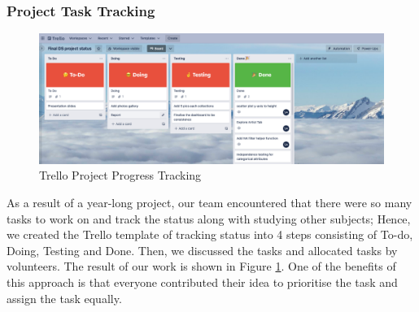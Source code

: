 \documentclass[11pt, oneside]{article}
\begin{document}
\subsubsection{Project Task Tracking}
\begin{figure}[H]
    \centering
    \includegraphics[scale=0.3]{images/Trello_tracking.png}
    \caption{Trello Project Progress Tracking}
    \label{Trello_tracking}
\end{figure}
As a result of a year-long project, our team encountered that there were so many tasks to work on and track the status along with studying other subjects; Hence, we created the Trello template of tracking status into 4 steps consisting of To-do, Doing, Testing and Done. Then, we discussed the tasks and allocated tasks by volunteers. The result of our work is shown in Figure \ref{Trello_tracking}.
\bigbreak
\noindent One of the benefits of this approach is that everyone contributed their idea to prioritise the task and assign the task equally.
\end{document}
